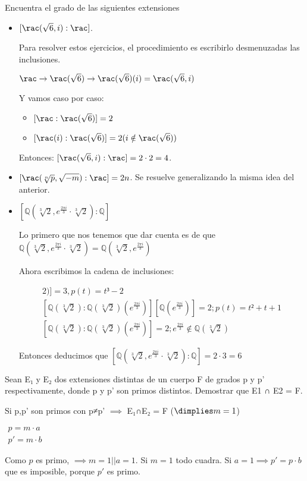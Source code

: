 \begin{problem}Encuentra el grado de las siguientes extensiones

\solution

\begin{itemize}

\item $[\rac(\sqrt{6},i):\rac]$. 

 Para resolver estos ejercicios, el procedimiento es escribirlo desmenuzadas las inclusiones.

$\rac \to \rac(\sqrt{6}) \to \rac(\sqrt{6})(i) = \rac(\sqrt{6},i)$

Y vamos caso por caso:

\begin{itemize}
\item $[\rac: \rac(\sqrt{6})] = 2$
\item $[\rac(i): \rac(\sqrt{6}) ] = 2 (i \notin \rac(\sqrt{6}))$
\end{itemize}

Entonces: $[\rac(\sqrt{6},i):\rac]= 2\cdot 2 = 4$.

\item $[\rac(\sqrt[n]{p},\sqrt{-m}):\rac] = 2n$. Se resuelve generalizando la misma idea del anterior.

\item $[ℚ(\sqrt[3]{2},e^{\frac{2 \pi i}{3}}\cdot \sqrt[3]{2}):ℚ]$

Lo primero que nos tenemos que dar cuenta es de que \\
 $ℚ(\sqrt[3]{2},e^{\frac{2 \pi i}{3}}\cdot \sqrt[3]{2}) = ℚ(\sqrt[3]{2},e^{\frac{2 \pi i}{3}})$
 
Ahora escribimos la cadena de inclusiones:

\begin{gather*}
[ℚ : ℚ(\sqrt[3]{2})] = 3, p(t)=t³-2\\
[ℚ(\sqrt[3]{2}) : ℚ(\sqrt[3]{2})(e^{\frac{2\pi i}{3}})]  [ℚ(e^{\frac{2\pi i}{3}})] = 2; p(t) =  t²+t+1\\
[ℚ(\sqrt[3]{2}) : ℚ(\sqrt[3]{2})(e^{\frac{2\pi i}{3}})] = 2; e^{\frac{2\pi i}{3}}∉ℚ(\sqrt[3]{2})
\end{gather*}

Entonces deducimos que $[ℚ(\sqrt[3]{2},e^{\frac{2 \pi i}{3}}\cdot \sqrt[3]{2}):ℚ] = 2·3 = 6$
\end{itemize}

\end{problem}


\begin{problem}[3]
Sean E₁ y E₂ dos extensiones distintas de un cuerpo F de grados p y p' respectivamente, donde p y p' son
primos distintos. Demostrar que E1 ∩ E2 = F.

\solution

Si p,p' son primos con p≠p' $\implies$ E₁∩E₂ = F ($\dimplies m=1$)


$\begin{array}{c}
p=m·a\\
p'=m·b
\end{array}$

Como $p$ es primo, $\implies m=1 || a=1$. Si $m=1$ todo cuadra. Si $a=1 \implies p'=p·b$ que es imposible, porque $p'$ es primo.
\end{problem}

